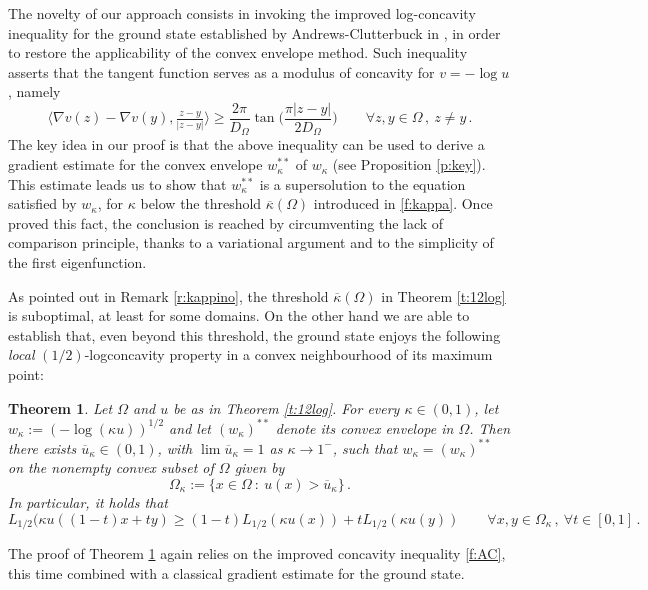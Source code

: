 \documentclass[11pt]{amsart}
\newtheorem{theorem}{Theorem}
\theoremstyle{definition}
\theoremstyle{remark}
\def\Om{\Omega}
\def\k{\kappa}
\begin{document}
The novelty of our approach consists  in invoking
the  improved log-concavity inequality for the ground state established by Andrews-Clutterbuck in \cite[Theorem 1.5]{AC11}, 
in order to restore the applicability of the convex envelope method. 
Such inequality asserts  that the tangent function serves as a modulus of concavity for $v = -\log u$, namely
\begin{equation}\label{f:AC}
\langle \nabla v(z) - \nabla v(y), \tfrac{z-y}{|z-y|} \rangle
\geq \frac{2\pi}{D_\Omega} 
\tan\!\Big( \frac{\pi |z-y|}{2D_\Omega} \Big)
\qquad \forall z,y \in \Omega \, , \ z \neq y\,.
\end{equation}
The key idea in our proof is that  the above inequality can be used to derive
a gradient estimate for the convex envelope $w _ \k ^ {**}$ of 
$w _\k$  (see Proposition \ref{p:key}).  This estimate leads us to show that $w _ \k ^ {**}$ is a supersolution to the equation satisfied by $w _\k$, 
 for $\kappa$ below the threshold $\overline{\kappa}(\Omega)$ introduced in \eqref{f:kappa}. 
Once proved this fact, the conclusion is reached by  circumventing the lack of comparison principle, thanks to a variational argument and to the simplicity of the first eigenfunction. 


\smallskip

As pointed out in Remark \ref{r:kappino}, the threshold $\overline \k (\Om)$ in Theorem \ref{t:12log} is suboptimal, at least  for some domains.
On the other hand we  are able to establish that,  even beyond this threshold, the ground state enjoys 
the following  {\it local} $(1/2)$-logconcavity property 
in a convex neighbourhood of its maximum point: 



\begin{theorem} \label{t:level} Let $\Om$ and $u $ be as in Theorem \ref{t:12log}. 
For every $\k \in (0, 1)$,  
let $w_\k := ( - \log (\k u  )  ) ^ {1/2}$
and let $(w_\k)^{**}$ denote its convex envelope in $\Omega$.
Then there exists $\overline u _\k \in (0, 1)$, with
$\lim \overline u _ \k  = 1$ as $\k   \to 1 ^ -$, such that
$w_\k = (w_\k)^{**}$
on the nonempty convex subset of $\Om$ given by 
\[
\Om_ \k :=  \big \{x \in \Om \ :\  u(x) > \overline u _\k  \big \}\,.
\]
In particular, it holds that
$$ L _{1/2}  (\k u ( ( 1- t )  x + t   y) \geq ( 1-t) L _{1/2} (\k u (x)) + t L _{1/2} (\k u  (y)) \qquad \forall x, y \in \Om _\k\,, \ \forall t \in [0, 1]\,.$$  
\end{theorem} 

The proof of Theorem \ref{t:level} again relies on  the improved concavity inequality \eqref{f:AC}, this time combined with a classical gradient estimate for the ground state. 
\end{document}
